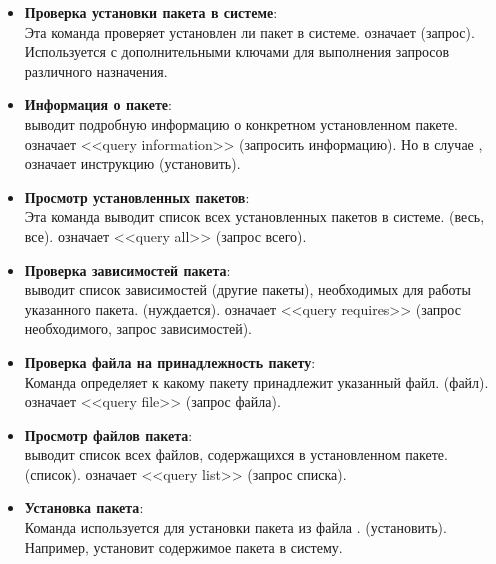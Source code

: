 \begin{itemize}
	\item \textbf{Проверка установки пакета в системе}: \\
	Эта команда проверяет установлен ли пакет в системе.  означает  (запрос).
	Используется с дополнительными ключами для выполнения запросов различного назначения.

	\item \textbf{Информация о пакете}: \\
	 выводит подробную информацию о конкретном установленном пакете.  означает <<query information>>
	(запросить информацию). Но в случае ,  означает инструкцию  (установить).

	\item \textbf{Просмотр установленных пакетов}: \\
	Эта команда выводит список всех установленных пакетов в системе.  (весь, все).  означает <<query all>> (запрос всего).

	\item \textbf{Проверка зависимостей пакета}: \\
	  выводит список зависимостей (другие пакеты), необходимых для работы указанного пакета. 
	(нуждается).  означает <<query requires>> (запрос необходимого, запрос зависимостей).

	\item \textbf{Проверка файла на принадлежность пакету}: \\
	Команда  определяет к какому пакету принадлежит указанный файл. 
	(файл).  означает <<query file>> (запрос файла).

	\item \textbf{Просмотр файлов пакета}: \\
	  выводит список всех файлов, содержащихся в установленном пакете. 
	(список).  означает <<query list>> (запрос списка).

	\item \textbf{Установка пакета}: \\
	Команда  используется для установки пакета из файла . 
	(установить). Например,  установит содержимое пакета  в систему.


\end{itemize}
